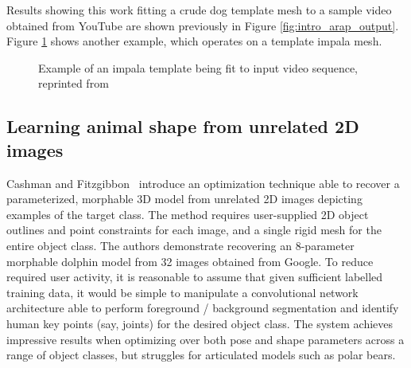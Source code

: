 Results showing this work fitting a crude dog template mesh to a sample video obtained from YouTube are shown previously in Figure \ref{fig:intro_arap_output}. Figure \ref{fig:arap_output} shows another example, which operates on a template impala mesh.

\begin{figure}[H]
    \caption{Example of an impala template being fit to input video sequence, reprinted from~\cite{arap_stebbing}}
    \label{fig:arap_output}
\end{figure}

\subsection{Learning animal shape from unrelated 2D images}
Cashman and Fitzgibbon~\cite{cashman2013shape} introduce an optimization technique able to recover a parameterized, morphable 3D model from unrelated 2D images depicting examples of the target class. The method requires user-supplied 2D object outlines and point constraints for each image, and a single rigid mesh for the entire object class. The authors demonstrate recovering an 8-parameter morphable dolphin model from 32 images obtained from Google. To reduce required user activity, it is reasonable to assume that given sufficient labelled training data, it would be simple to manipulate a convolutional network architecture able to perform foreground / background segmentation and identify human key points (say, joints) for the desired object class. The system achieves impressive results when optimizing over both pose and shape parameters across a range of object classes, but struggles for articulated models such as polar bears.

